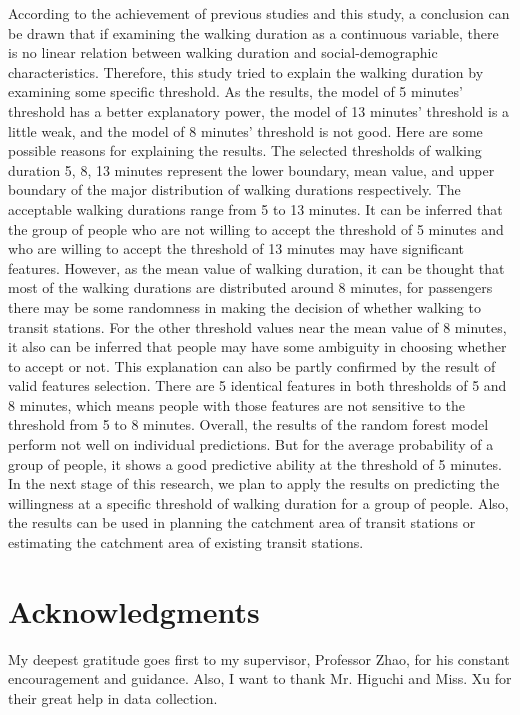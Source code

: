 \documentclass[Journal,letterpaper]{ascelike-new}
\begin{document}
According to the achievement of previous studies and this study, a conclusion can be drawn that if examining the walking duration as a continuous variable, there is no linear relation between walking duration and social-demographic characteristics. Therefore, this study tried to explain the walking duration by examining some specific threshold. As the results, the model of 5 minutes’ threshold has a better explanatory power, the model of 13 minutes' threshold is a little weak, and the model of 8 minutes' threshold is not good. Here are some possible reasons for explaining the results. The selected thresholds of walking duration 5, 8, 13 minutes represent the lower boundary, mean value, and upper boundary of the major distribution of walking durations respectively. The acceptable walking durations range from 5 to 13 minutes. It can be inferred that the group of people who are not willing to accept the threshold of 5 minutes and who are willing to accept the threshold of 13 minutes may have significant features. However, as the mean value of walking duration, it can be thought that most of the walking durations are distributed around 8 minutes, for passengers there may be some randomness in making the decision of whether walking to transit stations. For the other threshold values near the mean value of 8 minutes, it also can be inferred that people may have some ambiguity in choosing whether to accept or not. This explanation can also be partly confirmed by the result of valid features selection. There are 5 identical features in both thresholds of 5 and 8 minutes, which means people with those features are not sensitive to the threshold from 5 to 8 minutes.
%
Overall, the results of the random forest model perform not well on individual predictions. But for the average probability of a group of people, it shows a good predictive ability at the threshold of 5 minutes. In the next stage of this research, we plan to apply the results on predicting the willingness at a specific threshold of walking duration for a group of people. Also, the results can be used in planning the catchment area of transit stations or estimating the catchment area of existing transit stations.
%
\section{Acknowledgments}
My deepest gratitude goes first to my supervisor, Professor Zhao, for his constant encouragement and guidance. Also, I want to thank Mr. Higuchi and Miss. Xu for their great help in data collection.
%
\end{document}
